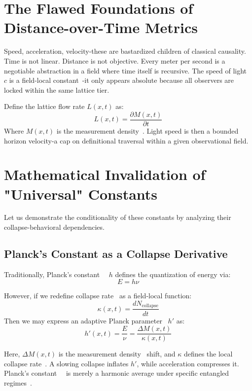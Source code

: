 \section*{The Flawed Foundations of Distance-over-Time Metrics}

Speed, acceleration, velocity-these are bastardized children of classical causality. Time is not linear. Distance is not objective. Every meter per second is a negotiable abstraction in a field where time itself is recursive. The speed of light~\cite{ashtekar2004background} $c$ is a field-local constant~\cite{hossenfelder2010minimal}-it only appears absolute because all observers are locked within the same lattice tier.

Define the lattice flow rate $L(x,t)$ as:
\[ L(x,t) = \frac{\partial M(x,t)}{\partial t} \]
Where $M(x,t)$ is the measurement density~\cite{joos1985emergence}. Light speed is then a bounded horizon velocity-a cap on definitional traversal within a given observational field.

\section*{Mathematical Invalidation of "Universal" Constants}

Let us demonstrate the conditionality of these constants by analyzing their collapse-behavioral dependencies.

\subsection*{Planck’s Constant as a Collapse Derivative}

Traditionally, Planck’s constant~\cite{rovelli1996relational}~\cite{barbour1999end} $h$ defines the quantization of energy via:
\[ E = h \nu \]

However, if we redefine collapse rate~\cite{penrose1996gravity} as a field-local function:
\[ \kappa(x, t) = \frac{dN_{\text{collapse}}}{dt} \]
Then we may express an adaptive Planck parameter~\cite{ghirardi1990markov} $h'$ as:
\[ h'(x, t) = \frac{E}{\nu} = \frac{\Delta M(x,t)}{\kappa(x,t)} \]

Here, $\Delta M(x,t)$ is the measurement density~\cite{joos1985emergence} shift, and $\kappa$ defines the local collapse rate~\cite{penrose1996gravity}. A slowing collapse inflates $h'$, while acceleration compresses it. Planck’s constant~\cite{rovelli1996relational}~\cite{barbour1999end} is merely a harmonic average under specific entangled regimes~\cite{zurek2003decoherence}.

